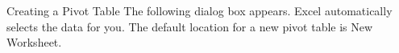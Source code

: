 \documentclass[xcolor=svgnames]{beamer}
\begin{document}
\begin{frame}{Creating a Pivot Table}
The following dialog box appears. Excel automatically selects the data for you. The default location for a new pivot table is New Worksheet.

\begin{center}
\end{center}
\end{frame}
\end{document}

